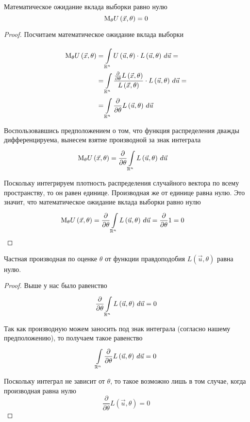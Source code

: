 \begin{remark}
     Математическое ожидание вклада выборки равно нулю
    $$\meanof{\theta}{U\left( \vec{x},\theta \right)}=0$$
\end{remark}
\begin{proof}
Посчитаем математическое ожидание вклада выборки

\begin{align*}
    \meanof{\theta}{U\left( \vec{x},\theta \right)}
        &=\integral{\mathbb{R}^n}{}{\vec{u}}
            {U\left( \vec{u},\theta \right)
                \cdot L\left( \vec{u},\theta \right)}=\\
        &=\integral{\mathbb{R}^n}{}{\vec{u}}
            {\frac{\frac{\partial}{\partial\theta}L\left(\vec{x},\theta\right)}
                {L\left(\vec{x},\theta\right)}
                \cdot L\left( \vec{u},\theta \right)}=\\
        &=\integral{\mathbb{R}^n}{}{\vec{u}}
            {\frac{\partial}{\partial\theta}
                L\left( \vec{u},\theta \right)}
\end{align*}

Воспользовавшись предположением о том,
что функция распределения дважды дифференцируема,
вынесем взятие производной за знак интеграла
\begin{align*}
    \meanof{\theta}{U\left( \vec{x},\theta \right)}
        &=\frac{\partial}{\partial\theta}
            \integral{\mathbb{R}^n}{}{\vec{u}}{L\left( \vec{u},\theta \right)}
\end{align*}

Поскольку интегрируем плотность распределения случайного вектора
по всему пространству, то он равен единице.
Производная же от единице равна нулю.
Это значит, что математическое ожидание вклада выборки равно нулю
\begin{align*}
    \meanof{\theta}{U\left( \vec{x},\theta \right)}
        &=\frac{\partial}{\partial\theta}
            \integral{\mathbb{R}^n}{}{\vec{u}}{L\left( \vec{u},\theta \right)}
        =\frac{\partial}{\partial\theta}1
        =0
\end{align*}
\end{proof}
\begin{remark}
    Частная производная по оценке $\theta$ от функции правдоподобия
    $L\left( \vec{u},\theta \right)$ равна нулю.
\end{remark}
\begin{proof}
    Выше у нас было равенство
    $$\frac{\partial}{\partial\theta}
        \integral{\mathbb{R}^n}{}{\vec{u}}{L\left( \vec{u},\theta \right)}=0$$

    Так как производную можем заносить под знак интеграла
    (согласно нашему предположению), то получаем такое равенство
    $$\integral{\mathbb{R}^n}{}{\vec{u}}{
        \frac{\partial}{\partial\theta}L\left( \vec{u},\theta \right)}=0$$

    Поскольку интеграл не зависит от $\theta$,
    то такое возможно лишь в том случае, когда производная равна нулю
    $$\frac{\partial}{\partial\theta}L\left( \vec{u},\theta \right)=0$$
\end{proof}
